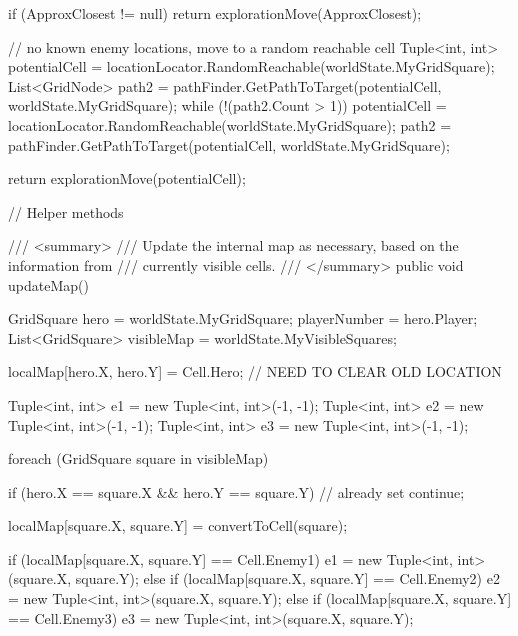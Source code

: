\documentclass[11pt]{article}
\begin{document}
\begin{code}
{{{            if (ApproxClosest != null)
            {
                return explorationMove(ApproxClosest);
            }

            // no known enemy locations, move to a random reachable cell
            Tuple<int, int> potentialCell = locationLocator.RandomReachable(worldState.MyGridSquare);
            List<GridNode> path2 = pathFinder.GetPathToTarget(potentialCell,
                        worldState.MyGridSquare);
            while (!(path2.Count > 1))
            {
                potentialCell = locationLocator.RandomReachable(worldState.MyGridSquare);
                path2 = pathFinder.GetPathToTarget(potentialCell,
                        worldState.MyGridSquare);
            }

            return explorationMove(potentialCell);
        }

        

        // Helper methods

        /// <summary>
        /// Update the internal map as necessary, based on the information from 
        /// currently visible cells.
        /// </summary>
        public void updateMap()
        {
            GridSquare hero = worldState.MyGridSquare;
            playerNumber = hero.Player;
            List<GridSquare> visibleMap = worldState.MyVisibleSquares;

            localMap[hero.X, hero.Y] = Cell.Hero; // NEED TO CLEAR OLD LOCATION

            Tuple<int, int> e1 = new Tuple<int, int>(-1, -1);
            Tuple<int, int> e2 = new Tuple<int, int>(-1, -1);
            Tuple<int, int> e3 = new Tuple<int, int>(-1, -1);
            
            foreach (GridSquare square in visibleMap)
            {
                if (hero.X == square.X && hero.Y == square.Y)
                {
                    // already set
                    continue;
                }

               localMap[square.X, square.Y] = convertToCell(square);

               if (localMap[square.X, square.Y] == Cell.Enemy1)
               {
                   e1 = new Tuple<int, int>(square.X, square.Y);
               }
               else if (localMap[square.X, square.Y] == Cell.Enemy2)
               {
                   e2 = new Tuple<int, int>(square.X, square.Y);
               }
               else if (localMap[square.X, square.Y] == Cell.Enemy3)
               {
                   e3 = new Tuple<int, int>(square.X, square.Y);
               }
            }

}}}
\end{code}
\end{document}
